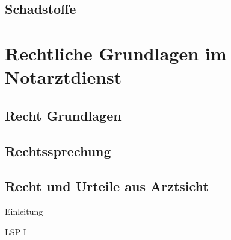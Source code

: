 \clearpage
\section{Schadstoffe} 


\chapter{Rechtliche Grundlagen im Notarztdienst}

\clearpage
\section{Recht Grundlagen}

\clearpage
\section{Rechtssprechung}

\clearpage
\section{Recht und Urteile aus Arztsicht}
Einleitung

LSP I
